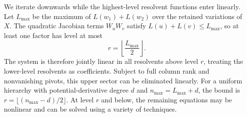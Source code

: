 We iterate downwards while the highest-level resolvent functions enter linearly. Let $L_{\max}$ be
the maximum of $L(w_1)+L(w_2)$ over the retained variations of $X$. The quadratic Jacobian terms
$W_uW_v$ satisfy $L(u)+L(v)\leq L_{\max}$, so at least one factor has level at most
\begin{equation}
    r=\left\lfloor\frac{L_{\max}}2\right\rfloor.
\end{equation}
The system is therefore jointly linear in all resolvents above level $r$, treating the lower-level
resolvents as coefficients. Subject to full column rank and nonvanishing pivots, this upper sector
can be eliminated linearly. For a uniform hierarchy with potential-derivative degree $d$ and
$n_{\max}=L_{\max}+d$, the bound is $r=\lfloor(n_{\max}-d)/2\rfloor$. At level $r$ and below, the
remaining equations may be nonlinear and can be solved using a variety of techniques.
